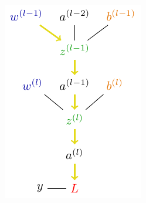 \begin{minipage}{0.45\textwidth}
\includegraphics[width=\textwidth]{tikz/chapter2 - Chain Rule Multiple Layer Dependencies.pdf}
\end{minipage}

